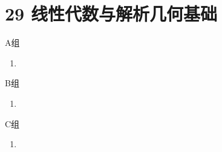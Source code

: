 \section*{29 线性代数与解析几何基础}

\vspace{2ex}

\centerline{\heiti A组}
\begin{enumerate}
    \item
\end{enumerate}

\centerline{\heiti B组}
\begin{enumerate}
    \item
\end{enumerate}

\centerline{\heiti C组}
\begin{enumerate}
    \item
\end{enumerate}

\clearpage
